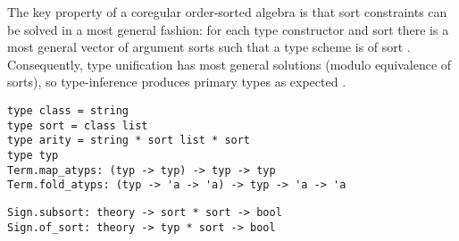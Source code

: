 \begin{isabellebody}
\begin{isamarkuptext}
  The key property of a coregular order-sorted algebra is that sort
  constraints can be solved in a most general fashion: for each type
  constructor  and sort  there is a most general
  vector of argument sorts  such
  that a type scheme  is of sort .
  Consequently, type unification has most general solutions (modulo
  equivalence of sorts), so type-inference produces primary types as
  expected \cite{nipkow-prehofer}.%
\end{isamarkuptext}%
\isamarkuptrue%
%
\isadelimmlref
%
\endisadelimmlref
%
\isatagmlref
%
\begin{isamarkuptext}%
\begin{mldecls}
  \verb|type class = string| \\
  \verb|type sort = class list| \\
  \verb|type arity = string * sort list * sort| \\
  \verb|type typ| \\
  \verb|Term.map_atyps: (typ -> typ) -> typ -> typ| \\
  \verb|Term.fold_atyps: (typ -> 'a -> 'a) -> typ -> 'a -> 'a| \\
  \end{mldecls}
  \begin{mldecls}
  \verb|Sign.subsort: theory -> sort * sort -> bool| \\
  \verb|Sign.of_sort: theory -> typ * sort -> bool| \\

\end{mldecls}
\end{isamarkuptext}
\end{isabellebody}
